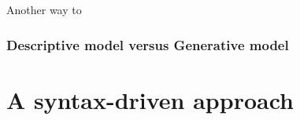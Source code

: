 Another way to    


\subsubsection{Descriptive model versus Generative model}

\section{A syntax-driven approach  }









